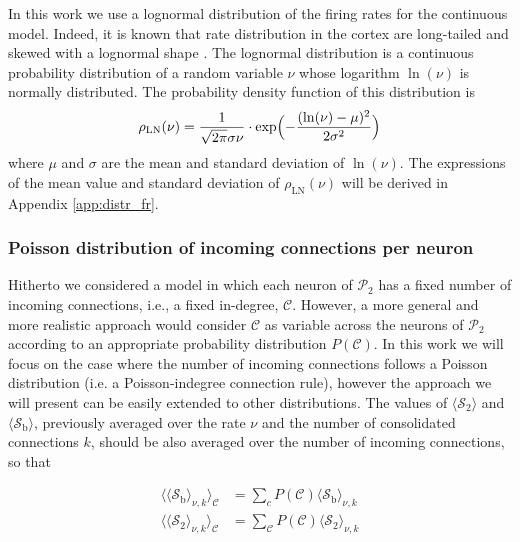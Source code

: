 \documentclass[a4paper, 12pt, twoside, openright]{book}
\newcommand{\popII}{\mathcal{P}_2}
\newcommand{\C}{\mathcal{C}}
\newcommand{\SII}{\mathcal{S}_\text{2}}
\newcommand{\Sb}{\mathcal{S}_\text{b}}
\begin{document}
In this work we use a lognormal distribution of the firing rates for the continuous model.
Indeed, it is known that rate distribution in the cortex are long-tailed and skewed with a lognormal shape 
\cite{Roxin2011}.
The lognormal distribution is a continuous probability distribution of a random variable $\nu$ whose logarithm 
$\ln(\nu)$ is normally distributed.
The probability density function of this distribution is
\begin{equation}
\label{eq:lognormal}
 \rho_\text{LN}(\nu) = \frac{1}{\sqrt{2\pi} \sigma \nu} \cdot \exp\Bigl( -\frac{(\ln(\nu)-\mu)^2}{2\sigma^2}\Bigr)
\end{equation}
where $\mu$ and $\sigma$ are the mean and standard deviation of $\ln(\nu)$.
The expressions of the mean value and standard deviation of $\rho_\text{LN}(\nu)$ will be derived in Appendix \ref{app:distr_fr}.

\subsubsection{\label{subsubseq:poiss-indegree} Poisson distribution of incoming connections per neuron}

Hitherto we considered a model in which each neuron of $\popII$ has a fixed number of incoming connections, i.e., a fixed in-degree, $\C$. However, a more general and more realistic approach would consider $\C$ as variable across the neurons of $\popII$
according to an appropriate probability distribution
$P(\C)$.
In this work we will focus on the case where the number of incoming connections follows a Poisson distribution (i.e. a Poisson-indegree connection rule), however the approach we will present can be easily extended to other distributions.
The values of $\langle \SII \rangle$ and $\langle \Sb \rangle$, previously averaged over the rate $\nu$ and the number of consolidated connections $k$, should be also averaged over the number of incoming connections, so that

\begin{equation}
    \begin{split}
        \langle \langle \Sb \rangle_{\nu,k} \rangle_{\C} &= \sum_{c} P(\C) \langle \Sb \rangle_{\nu,k}\\
        \langle \langle \SII \rangle_{\nu,k} \rangle_{\C} &= \sum_{\C} P(\C) \langle \SII \rangle _{\nu,k}
    \end{split}
    \label{eq:averaging_over_C}
\end{equation}
\end{document}
